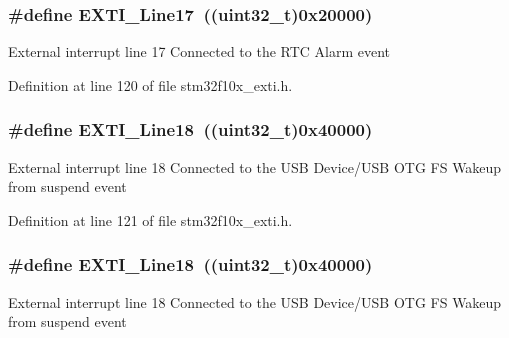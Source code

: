\subsubsection[{\texorpdfstring{E\+X\+T\+I\+\_\+\+Line17}{EXTI_Line17}}]{\setlength{\rightskip}{0pt plus 5cm}\#define E\+X\+T\+I\+\_\+\+Line17~(({\bf uint32\+\_\+t})0x20000)}\hypertarget{group___e_x_t_i___lines_ga3e0fc18bc0722adc09605e3093b24c6a}{}\label{group___e_x_t_i___lines_ga3e0fc18bc0722adc09605e3093b24c6a}
External interrupt line 17 Connected to the R\+TC Alarm event 

Definition at line 120 of file stm32f10x\+\_\+exti.\+h.

\subsubsection[{\texorpdfstring{E\+X\+T\+I\+\_\+\+Line18}{EXTI_Line18}}]{\setlength{\rightskip}{0pt plus 5cm}\#define E\+X\+T\+I\+\_\+\+Line18~(({\bf uint32\+\_\+t})0x40000)}\hypertarget{group___e_x_t_i___lines_ga6cdf346a3e7a3c8dbb036aca6741207c}{}\label{group___e_x_t_i___lines_ga6cdf346a3e7a3c8dbb036aca6741207c}
External interrupt line 18 Connected to the U\+SB Device/\+U\+SB O\+TG FS Wakeup from suspend event 

Definition at line 121 of file stm32f10x\+\_\+exti.\+h.

\subsubsection[{\texorpdfstring{E\+X\+T\+I\+\_\+\+Line18}{EXTI_Line18}}]{\setlength{\rightskip}{0pt plus 5cm}\#define E\+X\+T\+I\+\_\+\+Line18~(({\bf uint32\+\_\+t})0x40000)}\hypertarget{group___e_x_t_i___lines_ga6cdf346a3e7a3c8dbb036aca6741207c}{}\label{group___e_x_t_i___lines_ga6cdf346a3e7a3c8dbb036aca6741207c}
External interrupt line 18 Connected to the U\+SB Device/\+U\+SB O\+TG FS Wakeup from suspend event 

